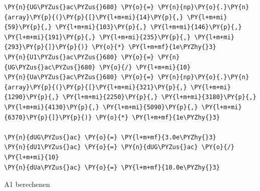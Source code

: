 \begin{tcolorbox}[breakable, size=fbox, boxrule=1pt, pad at break*=1mm,colback=cellbackground, colframe=cellborder]
\begin{Verbatim}[commandchars=\\\{\}]
\PY{n}{UG\PYZus{}ac\PYZus{}680} \PY{o}{=} \PY{n}{np}\PY{o}{.}\PY{n}{array}\PY{p}{(}\PY{p}{[}\PY{l+m+mi}{14}\PY{p}{,} \PY{l+m+mi}{59}\PY{p}{,} \PY{l+m+mi}{103}\PY{p}{,} \PY{l+m+mi}{146}\PY{p}{,} \PY{l+m+mi}{191}\PY{p}{,} \PY{l+m+mi}{235}\PY{p}{,} \PY{l+m+mi}{293}\PY{p}{]}\PY{p}{)} \PY{o}{*} \PY{l+m+mf}{1e\PYZhy{}3}
\PY{n}{U1\PYZus{}ac\PYZus{}680} \PY{o}{=} \PY{n}{UG\PYZus{}ac\PYZus{}680} \PY{o}{/} \PY{l+m+mi}{10}
\PY{n}{Ua\PYZus{}ac\PYZus{}680} \PY{o}{=} \PY{n}{np}\PY{o}{.}\PY{n}{array}\PY{p}{(}\PY{p}{[}\PY{l+m+mi}{321}\PY{p}{,} \PY{l+m+mi}{1290}\PY{p}{,} \PY{l+m+mi}{2250}\PY{p}{,} \PY{l+m+mi}{3180}\PY{p}{,} \PY{l+m+mi}{4130}\PY{p}{,} \PY{l+m+mi}{5090}\PY{p}{,} \PY{l+m+mi}{6370}\PY{p}{]}\PY{p}{)} \PY{o}{*} \PY{l+m+mf}{1e\PYZhy{}3}

\PY{n}{dUG\PYZus{}ac} \PY{o}{=} \PY{l+m+mf}{3.0e\PYZhy{}3}
\PY{n}{dU1\PYZus{}ac} \PY{o}{=} \PY{n}{dUG\PYZus{}ac} \PY{o}{/} \PY{l+m+mi}{10}
\PY{n}{dUa\PYZus{}ac} \PY{o}{=} \PY{l+m+mf}{10.0e\PYZhy{}3}
\end{Verbatim}
\end{tcolorbox}

    A1 berechenen

